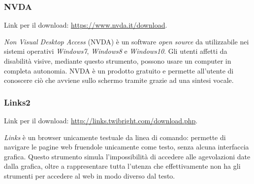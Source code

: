 \subsubsection{NVDA}
\label{test-strumenti-nvda}
Link per il download: \url{https://www.nvda.it/download}.

\textit{Non Visual Desktop Access} (NVDA) è un software \textit{open source} da utilizzabile nei sistemi operativi \textit{Windows7}, \textit{Windows8} e \textit{Windows10}.
Gli utenti affetti da disabilità visive, mediante questo strumento, possono usare un computer in completa autonomia. NVDA è un prodotto gratuito e permette all'utente di conoscere ciò che avviene sullo schermo tramite grazie ad una sintesi vocale.

\subsubsection{Links2}
\label{test-strumenti-links2}
Link per il download: \url{http://links.twibright.com/download.php}.

\textit{Links} è un browser unicamente testuale da linea di comando: permette di navigare le pagine web fruendole unicamente come testo, senza alcuna interfaccia grafica. Questo strumento simula l'impossibilità di accedere alle agevolazioni date dalla grafica, oltre a rappresentare tutta l'utenza che effettivamente non ha gli strumenti per accedere al web in modo diverso dal testo.

